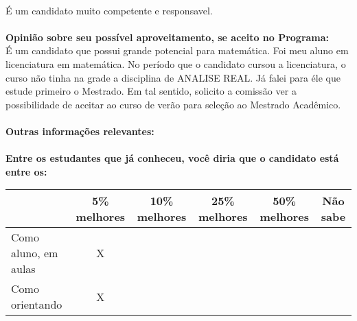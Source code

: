 \documentclass[11pt]{article}
\begin{document}
\\É um candidato muito competente e responsavel.\\
\\
\textbf{Opinião sobre seu possível aproveitamento, se aceito no Programa:}
\\É um candidato que possui grande potencial para matemática. Foi meu aluno em licenciatura em matemática. No período que o candidato cursou a licenciatura, o curso não tinha na grade a disciplina de ANALISE REAL. Já falei para éle que estude primeiro o Mestrado.
Em tal sentido, solicito a comissão ver a possibilidade de aceitar ao curso de verão para seleção ao Mestrado Acadêmico.  \\ 
\\
\textbf{Outras informações relevantes:} \\
\\[0.3cm]
\textbf{Entre os estudantes que já conheceu, você diria que o candidato está entre os:}
\\
\begin{tabular}{|l|c|c|c|c|c|}
\hline
 & 5\% melhores & 10\% melhores & 25\% melhores & 50\% melhores & Não sabe \\
\hline
Como aluno, em aulas & X &  &  &  & \\
\hline
Como orientando & X &  &  &  & \\
\hline
\end{tabular}
\end{document}

